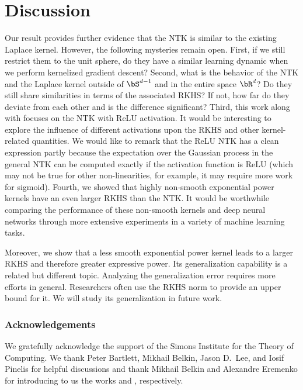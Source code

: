 \documentclass[11pt]{article}
\begin{document}
\section{Discussion}
Our result provides further evidence that the NTK is similar to the existing Laplace kernel. However, the following mysteries remain open. 
First, if we still restrict them to the unit sphere, do they have a similar learning dynamic when we perform kernelized gradient descent? 
Second, what is the behavior of the NTK and the Laplace kernel outside of $\bS^{d-1}$ and in the entire space $\bR^{d}$? Do they still share similarities in terms of the associated RKHS? If not, how far do they deviate from each other and is the difference significant? 
Third, this work along with \citep{bietti2019inductive,geifman2020similarity} focuses on the NTK with ReLU activation. It would be interesting to explore the influence of different activations upon the RKHS and other kernel-related quantities. We would like to remark that the ReLU NTK has a clean expression partly because the expectation over the Gaussian process in the general NTK can be computed exactly if the activation function is ReLU (which may not be true for other non-linearities, for example, it may require more work for sigmoid). 
Fourth, we showed that highly non-smooth exponential power kernels have an even larger RKHS than the NTK. It would be worthwhile comparing the performance of these non-smooth kernels and deep neural networks through more extensive experiments in a variety of machine learning tasks. 

Moreover, we show that a less smooth exponential power kernel leads to a larger RKHS and therefore greater expressive power. Its generalization capability is a related but different topic. Analyzing the generalization error requires more efforts in general. Researchers often use the RKHS norm to provide an upper bound for it. We will study its generalization in future work. 

\subsubsection*{Acknowledgements}
We gratefully acknowledge the support of the Simons Institute for the Theory of Computing.
We thank Peter Bartlett, Mikhail Belkin, Jason D.~Lee, 
and Iosif Pinelis for helpful discussions and thank Mikhail Belkin and Alexandre Eremenko for introducing to us the works \citep{hui2019kernel,liu2020toward} and \citep{flajolet2009analytic}, respectively.
\end{document}
